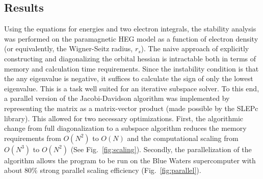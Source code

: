 \documentclass{revtex4}
\begin{document}
 \subsection{Results}   
      Using the equations for energies and two electron integrals, the stability analysis was 
      performed on the paramagnetic HEG model as a function of electron density (or equivalently, 
      the Wigner-Seitz radius, 
      $r_s$). The naive approach of explicitly constructing and diagonalizing the orbital hessian 
      is intractable both in terms of memory and calculation time requirements. Since the 
      instability condition is that the any eigenvalue is negative, it suffices to calculate the 
      sign of only the lowest eigenvalue. This is a task well suited for an iterative subspace 
      solver. To this end, a parallel version of the Jacobi-Davidson algorithm 
      was implemented by representing the matrix as a matrix-vector product (made possible by the 
      SLEPc library\cite{Hernandez2005}). This allowed for two necessary optimizations. First, the 
      algorithmic change from full diagonalization to a subspace algorithm reduces the memory 
      requirements from $O(N^2)$ to $O(N)$ and the computational scaling from $O(N^3)$ to $O(N^2)$ 
      (See Fig.~\ref{fig:scaling}). 
      Secondly, the parallelization of the algorithm allows the program to be run on the Blue 
      Waters supercomputer with about 80\% strong parallel scaling efficiency 
      (Fig.~\ref{fig:parallel}). 
\end{document}
